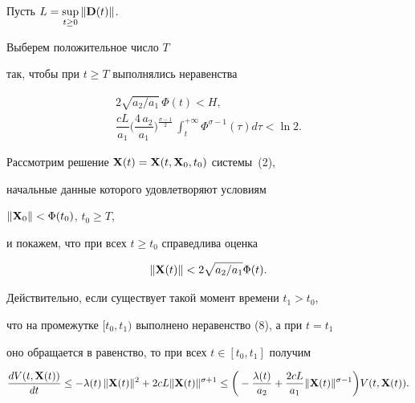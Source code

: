 \begin{pf}


Пусть $L=\sup\limits_{t\geq 0} \|\bold D(t)\|$.


Выберем положительное число $T$


так, чтобы при $t\geq T$ выполнялись неравенства


\begin{equation}


\begin{array}{c}


2 \sqrt{a_2/a_1} \, \Phi(t) <H, \\[3mm]


\dfrac{cL}{a_1} \bigg(\dfrac{4\,a_2}{a_1}\bigg)^{\frac{\sigma-1}2} \,


\displaystyle\int_t^{+\infty} \Phi^{\sigma-1}(\tau)d\tau < \ln 2.


\end{array}


\end{equation}





Рассмотрим решение $\bold X(t)=\bold X(t,\bold X_0,t_0)$ системы~(2),


начальные данные которого удовлетворяют условиям


$\|\bold X_0\| < \Phi(t_0)$, $t_0\geq T$,


и покажем, что при всех $t\geq t_0$ справедлива оценка


\begin{equation}


\|\bold X(t) \| <2 \sqrt{a_2/a_1} \Phi(t).


\end{equation}


Действительно, если существует такой момент времени $t_1>t_0$, 


что на промежутке $[t_0, t_1)$ выполнено неравенство (8), а при $t=t_1$


оно обращается в равенство, то при всех $t\in [t_0, t_1]$ получим


$$


\frac{dV(t,\bold X(t))}{dt} \leq -\lambda(t) \, \|\bold X(t)\|^2


+2cL \|\bold X(t)\|^{\sigma+1}\leq 


\bigg(-\frac{\lambda(t)}{a_2}+ \frac{2 c L}{a_1} \|\bold X(t)\|^


{\sigma-1} \bigg) V(t,\bold X(t)).


$$



\end{pf}
